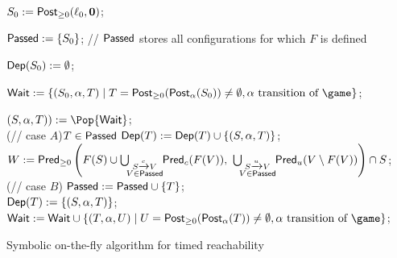 \begin{algorithm}
  \SetAlgoNoEnd

  $S_0:=\textrm{\sf Post}_{\geq 0}(\ell_0,\mathbf 0)$;
  
  


  $\textsf{Passed}:=\{S_0\}$;  \hfill
  // $\textsf{Passed}$ stores all configurations for which $F$ is defined

  
  $\textsf{Dep}(S_0):=\emptyset$;

  $\Wait:=\{(S_0,\alpha,T) \mid 
    T=\posttime(\postta_{\alpha}(S_0))\not=\emptyset, \alpha\text{ transition of }\game\}$;

        {$(S,\alpha,T)):=\Pop{\Wait}$;\\
          \If(\hfill{// case $A$}){$T\in\textsf{Passed}$}
          {$\textsf{Dep}(T):=\textsf{Dep}(T) \cup \{(S,\alpha,T)\}$;\\
          $W:=\predt\left(F(S)\cup \bigcup_{\substack{S\xrightarrow{c} V\\ \!\!V\in\Passed\!\!}} \predc(F(V)),\ \bigcup_{\substack{S\xrightarrow{u} V\\ \!\!V\in\Passed\!\!}}\predu(V\setminus F(V))\right) \cap S$;\\
          }
          \Else(\hfill{// case $B$})
                  {$\textsf{Passed}:=\textsf{Passed} \cup\{T\}$; \\
                  $\textsf{Dep}(T):=\{(S,\alpha,T)\}$;\\
                  $\Wait:=\Wait\cup\{(T,\alpha,U) \mid U=\posttime(\postta_{\alpha}(T))\not=\emptyset, \alpha\text{ transition of }\game\}$;
        }
        }

        \caption{Symbolic on-the-fly algorithm for timed reachability}
  \label{9-algo:sotftr}
\end{algorithm}




